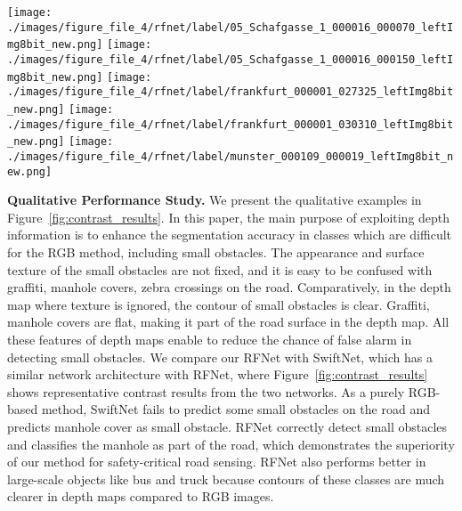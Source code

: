 \documentclass[letterpaper, 10 pt, journal, twoside]{ieeetran}
\begin{document}
\begin{figure*}
{\begin{minipage}[b]{0.19\linewidth}
        \texttt{[image: ./images/figure\_file\_4/rfnet/label/05\_Schafgasse\_1\_000016\_000070\_leftImg8bit\_new.png]}\vspace{1pt}
        \texttt{[image: ./images/figure\_file\_4/rfnet/label/05\_Schafgasse\_1\_000016\_000150\_leftImg8bit\_new.png]}\vspace{1pt}
        \texttt{[image: ./images/figure\_file\_4/rfnet/label/frankfurt\_000001\_027325\_leftImg8bit\_new.png]}\vspace{1pt}
        \texttt{[image: ./images/figure\_file\_4/rfnet/label/frankfurt\_000001\_030310\_leftImg8bit\_new.png]}\vspace{1pt}
        \texttt{[image: ./images/figure\_file\_4/rfnet/label/munster\_000109\_000019\_leftImg8bit\_new.png]}\vspace{1pt}
    \end{minipage}}


    \caption{Qualitative semantic segmentation results from SwiftNet and the proposed RFNet that exploits both RGB and depth information.}
    \label{fig:contrast_results}
\end{figure*}


\textbf{Qualitative Performance Study.}
We present the qualitative examples in Figure~\ref{fig:contrast_results}. In this paper, the main purpose of exploiting depth information is to enhance the segmentation accuracy in classes which are difficult for the RGB method, including small obstacles. The appearance and surface texture of the small obstacles are not fixed, and it is easy to be confused with graffiti, manhole covers, zebra crossings on the road. Comparatively, in the depth map where texture is ignored, the contour of small obstacles is clear. Graffiti, manhole covers are flat, making it part of the road surface in the depth map. All these features of depth maps enable to reduce the chance of false alarm in detecting small obstacles. We compare our RFNet with SwiftNet\cite{orsic2019defense}, which has a similar network architecture with RFNet, where Figure~\ref{fig:contrast_results} shows representative contrast results from the two networks. As a purely RGB-based method, SwiftNet fails to predict some small obstacles on the road and predicts manhole cover as small obstacle. RFNet correctly detect small obstacles and classifies the manhole as part of the road, which demonstrates the superiority of our method for safety-critical road sensing. RFNet also performs better in large-scale objects like bus and truck because contours of these classes are much clearer in depth maps compared to RGB images.
\end{document}
